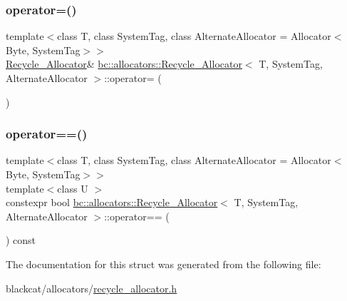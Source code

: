 \mbox{\label{structbc_1_1allocators_1_1Recycle__Allocator_a1b17506ad1426bbd115458b7cadb575d}} 
\subsubsection{\texorpdfstring{operator=()}{operator=()}\hspace{0.1cm}{\footnotesize\ttfamily [2/2]}}
{\footnotesize\ttfamily template$<$class T, class System\+Tag, class Alternate\+Allocator = Allocator$<$\+Byte, System\+Tag$>$$>$ \\
\hyperlink{structbc_1_1allocators_1_1Recycle__Allocator}{Recycle\+\_\+\+Allocator}\& \hyperlink{structbc_1_1allocators_1_1Recycle__Allocator}{bc\+::allocators\+::\+Recycle\+\_\+\+Allocator}$<$ T, System\+Tag, Alternate\+Allocator $>$\+::operator= (\begin{DoxyParamCaption}\item[{\hyperlink{structbc_1_1allocators_1_1Recycle__Allocator}{Recycle\+\_\+\+Allocator}$<$ T, System\+Tag, Alternate\+Allocator $>$ \&\&}]{ }\end{DoxyParamCaption})\hspace{0.3cm}{\ttfamily [default]}}

\mbox{\label{structbc_1_1allocators_1_1Recycle__Allocator_a1f763358fde2b3f5e0a1c7ddcec4e551}} 
\subsubsection{\texorpdfstring{operator==()}{operator==()}}
{\footnotesize\ttfamily template$<$class T, class System\+Tag, class Alternate\+Allocator = Allocator$<$\+Byte, System\+Tag$>$$>$ \\
template$<$class U $>$ \\
constexpr bool \hyperlink{structbc_1_1allocators_1_1Recycle__Allocator}{bc\+::allocators\+::\+Recycle\+\_\+\+Allocator}$<$ T, System\+Tag, Alternate\+Allocator $>$\+::operator== (\begin{DoxyParamCaption}\item[{const \hyperlink{structbc_1_1allocators_1_1Recycle__Allocator}{Recycle\+\_\+\+Allocator}$<$ U, System\+Tag, Alternate\+Allocator $>$ \&}]{ }\end{DoxyParamCaption}) const\hspace{0.3cm}{\ttfamily [inline]}}



The documentation for this struct was generated from the following file\+:\begin{DoxyCompactItemize}
\item 
blackcat/allocators/\hyperlink{recycle__allocator_8h}{recycle\+\_\+allocator.\+h}\end{DoxyCompactItemize}
